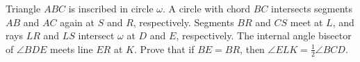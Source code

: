 Triangle $ABC$ is inscribed in circle $\omega$.  A circle with chord $BC$ intersects segments $AB$ and $AC$ again at $S$ and $R$, respectively.  Segments $BR$ and $CS$ meet at $L$, and rays $LR$ and $LS$ intersect $\omega$ at $D$ and $E$, respectively.  The internal angle bisector of $\angle BDE$ meets line $ER$ at $K$.  Prove that if $BE = BR$, then $\angle ELK = \tfrac{1}{2} \angle BCD$.